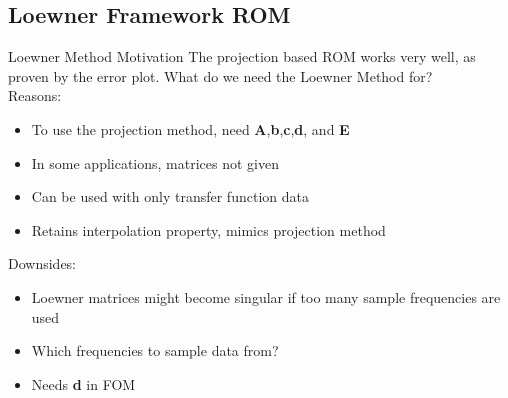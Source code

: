\subsection{Loewner Framework ROM}

\begin{frame}{Loewner Method Motivation}
The projection based ROM works very well, as proven by the error plot. What do we need the Loewner Method for?\\
\bigskip
Reasons:
\begin{itemize}
    \item To use the projection method, need {\bf A},{\bf b},{\bf c},{\bf d}, and {\bf E}
    \item In some applications, matrices not given
    \item Can be used with only transfer function data
    \item Retains interpolation property, mimics projection method
\end{itemize}
\bigskip
Downsides:
\begin{itemize}
    \item Loewner matrices might become singular if too many sample frequencies are used
    \item Which frequencies to sample data from?
    \item Needs {\bf d} in FOM
\end{itemize}
    
\end{frame}

